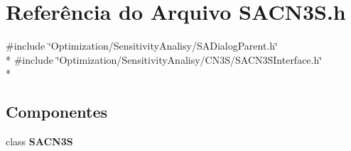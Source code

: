 \section{Referência do Arquivo S\+A\+C\+N3\+S.\+h}
\label{_s_a_c_n3_s_8h}
{\ttfamily \#include \char`\"{}Optimization/\+Sensitivity\+Analisy/\+S\+A\+Dialog\+Parent.\+h\char`\"{}}\\*
{\ttfamily \#include \char`\"{}Optimization/\+Sensitivity\+Analisy/\+C\+N3\+S/\+S\+A\+C\+N3\+S\+Interface.\+h\char`\"{}}\\*
\subsection*{Componentes}
\begin{DoxyCompactItemize}
\item 
class {\bf S\+A\+C\+N3S}
\end{DoxyCompactItemize}
